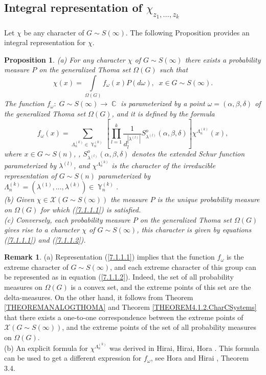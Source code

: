\documentclass[12pt]{amsart}
\newtheorem{prop}[thm]{Proposition}
\theoremstyle{definition}
\newtheorem{rem}[thm]{Remark}
\numberwithin{equation}{section}
\DeclareMathOperator{\Y}{\mathbb{Y}}
\DeclareMathOperator{\C}{\mathbb{C}}
\begin{document}
\subsection{Integral representation of $\chi_{z_1,\ldots,z_k}$}\label{SectionIntRepChizzz}
Let $\chi$ be any character of $G\sim S(\infty)$. The following Proposition provides an integral representation for $\chi$.
\begin{prop}\label{Proposition7.1.1}(a) For any character $\chi$ of $G\sim S(\infty)$ there exists a probability measure $P$ on the generalized Thoma set $\Omega(G)$ such that
\begin{equation}\label{7.1.1.1}
\chi(x)=\int\limits_{\Omega(G)}f_{\omega}(x)P(d\omega),\;\; x\in G\sim S(\infty).
\end{equation}
The function
$
f_{\omega}:\;G\sim S(\infty)\longrightarrow\C
$
is parameterized by a point $\omega=\left(\alpha,\beta,\delta\right)$ of the generalized Thoma set $\Omega(G)$, and it is
defined by the formula
\begin{equation}\label{7.1.1.2}
f_{\omega}(x)=\sum\limits_{\Lambda_n^{(k)}\in\Y_n^{(k)}}
\left[\prod\limits_{l=1}^k\frac{1}{d_l^{|\lambda^{(l)}|}}
S_{\lambda^{(l)}}^{o}\left(\alpha,\beta,\delta\right)\right]
\chi^{\Lambda_n^{(k)}}(x),
\end{equation}
where $x\in G\sim S(n)$, ,
$S_{\lambda^{(l)}}^{o}\left(\alpha,\beta,\delta\right)$ denotes the extended Schur function parameterized by $\lambda^{(l)}$, and
$\chi^{\Lambda_n^{(k)}}$ is the character of the irreducible representation of $G\sim S(n)$ parameterized by $\Lambda_n^{(k)}=\left(\lambda^{(1)},\ldots,\lambda^{(k)}\right)\in\Y_n^{(k)}$.
\\
(b) Given $\chi\in\mathcal{X}\left(G\sim S(\infty)\right)$ the measure $P$ is the unique probability measure on $\Omega\left(G\right)$ for which (\ref{7.1.1.1}) is satisfied.\\
(c) Conversely, each probability measure $P$ on the generalized Thoma set $\Omega(G)$ gives rise to a character $\chi$ of $G\sim S(\infty)$, this character is given by equations (\ref{7.1.1.1}) and (\ref{7.1.1.2}).
\end{prop}
\begin{rem}
(a) Representation (\ref{7.1.1.1}) implies that the function $f_{\omega}$ is the extreme character of $G\sim S(\infty)$, and each extreme character of this
group can be represented as in equation (\ref{7.1.1.2}). Indeed, the set of all probability measures on $\Omega\left(G\right)$ is a convex set, and the extreme points of this set are the delta-measures. On the other hand, it follows from Theorem \ref{THEOREMANALOGTHOMA} and Theorem \ref{THEOREM4.1.2.CharCSystems} that there exists a one-to-one correspondence between the extreme points of $\mathcal{X}\left(G\sim S(\infty)\right)$, and the extreme points of the set of all probability measures on $\Omega\left(G\right)$.\\
(b) An explicit formula for $\chi^{\Lambda_n^{(k)}}$ was derived in Hirai, Hirai, Hora \cite{HiraiHiraiHoraI}. This formula can be used to get a different expression for $f_{\omega}$, see Hora and Hirai \cite{HoraHirai}, Theorem 3.4.
\end{rem}
\end{document}
